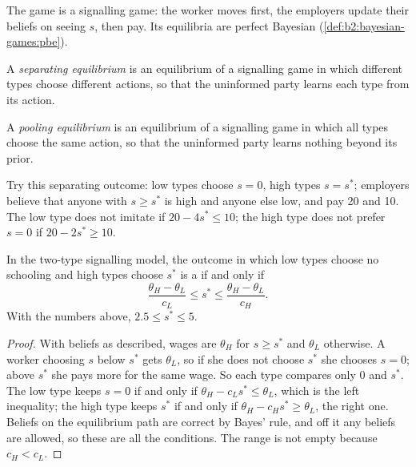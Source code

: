The game is a signalling game: the worker moves first, the employers update their beliefs on seeing $s$, then pay. Its
equilibria are perfect Bayesian (\cref{def:b2:bayesian-games:pbe}).

\begin{definition}\label{def:b2:signalling-and-screening:separating}
A \emph{separating equilibrium} is an equilibrium of a signalling game in which different
types choose different actions, so that the uninformed party learns each type from its action.
\end{definition}

\begin{definition}\label{def:b2:signalling-and-screening:pooling}
A \emph{pooling equilibrium} is an equilibrium of a signalling game in which all types choose
the same action, so that the uninformed party learns nothing beyond its prior.
\end{definition}

Try this separating outcome: low types choose $s = 0$, high types $s = s^*$; employers believe that anyone with $s \ge s^*$ is high and
anyone else low, and pay 20 and 10. The low type does not imitate if $20 - 4s^* \le 10$; the high type does not prefer $s = 0$ if
$20 - 2s^* \ge 10$.

\begin{proposition}\label{prop:b2:signalling-and-screening:range}
In the two-type signalling model, the outcome in which low types choose no schooling and high types choose $s^*$ is a
 if and only if
\[
  \frac{\theta_H - \theta_L}{c_L} \le s^* \le \frac{\theta_H - \theta_L}{c_H}.
\]
With the numbers above, $2.5 \le s^* \le 5$.
\end{proposition}

\begin{proof}
With beliefs as described, wages are $\theta_H$ for $s \ge s^*$ and $\theta_L$ otherwise. A worker choosing $s$ below $s^*$ gets $\theta_L$, so if she
does not choose $s^*$ she chooses $s = 0$; above $s^*$ she pays more for the same wage. So each type compares only 0 and $s^*$. The low
type keeps $s = 0$ if and only if $\theta_H - c_L s^* \le \theta_L$, which is the left inequality; the high type keeps $s^*$ if and only if
$\theta_H - c_H s^* \ge \theta_L$, the right one. Beliefs on the equilibrium path are correct by Bayes' rule, and off it any beliefs are
allowed, so these are all the conditions. The range is not empty because $c_H < c_L$.
\end{proof}

